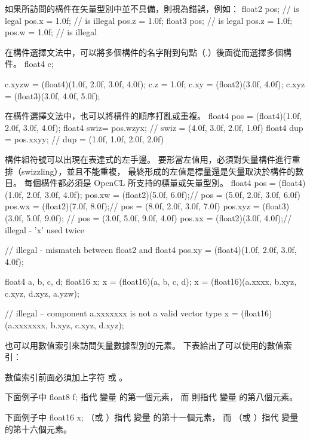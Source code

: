 如果所訪問的構件在矢量型別中並不具備，則視為錯誤，例如：
\startclc
float2 pos;	// is legal
pos.x = 1.0f;	// is illegal
pos.z = 1.0f;
float3 pos;	// is legal
pos.z = 1.0f;
pos.w = 1.0f;	// is illegal
\stopclc

在構件選擇文法中，可以將多個構件的名字附到句點（.）後面從而選擇多個構件。
\startclc
float4 c;

c.xyzw = (float4)(1.0f, 2.0f, 3.0f, 4.0f);
c.z = 1.0f;
c.xy = (float2)(3.0f, 4.0f);
c.xyz = (float3)(3.0f, 4.0f, 5.0f);
\stopclc

在構件選擇文法中，也可以將構件的順序打亂或重複。
\startclc
float4 pos = (float4)(1.0f, 2.0f, 3.0f, 4.0f);
float4 swiz= pos.wzyx; // swiz = (4.0f, 3.0f, 2.0f, 1.0f)
float4 dup = pos.xxyy; // dup = (1.0f, 1.0f, 2.0f, 2.0f)
\stopclc

構件組符號可以出現在表達式的左手邊。
要形當左值用，必須對矢量構件進行重排（swizzling），並且不能重複，
最終形成的左值是標量還是矢量取決於構件的數目。
每個構件都必須是 OpenCL 所支持的標量或矢量型別。
\startclc
float4 pos = (float4)(1.0f, 2.0f, 3.0f, 4.0f);
pos.xw = (float2)(5.0f, 6.0f);// pos = (5.0f, 2.0f, 3.0f, 6.0f)
pos.wx = (float2)(7.0f, 8.0f);// pos = (8.0f, 2.0f, 3.0f, 7.0f)
pos.xyz = (float3)(3.0f, 5.0f, 9.0f); // pos = (3.0f, 5.0f, 9.0f, 4.0f)
pos.xx = (float2)(3.0f, 4.0f);// illegal - 'x' used twice

// illegal - mismatch between float2 and float4
pos.xy = (float4)(1.0f, 2.0f, 3.0f, 4.0f);

float4 a, b, c, d;
float16 x;
x = (float16)(a, b, c, d);
x = (float16)(a.xxxx, b.xyz, c.xyz, d.xyz, a.yzw);

// illegal – component a.xxxxxxx is not a valid vector type
x = (float16)(a.xxxxxxx, b.xyz, c.xyz, d.xyz);
\stopclc

也可以用數值索引來訪問矢量數據型別的元素。
下表給出了可以使用的數值索引：

{}

數值索引前面必須加上字符  或 。

下面例子中
\startclc
float8	f;
\stopclc
{} 指代  變量  的第一個元素，
而  則指代  變量  的第八個元素。

下面例子中
\startclc
float16	x;
\stopclc
{} （或 ）指代  變量  的第十一個元素，
而  （或 ）指代  變量  的第十六個元素。


